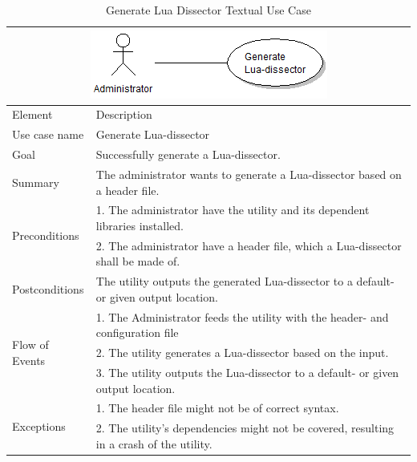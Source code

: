 \begin{table}[htbp] \footnotesize \center
\caption{Generate Lua Dissector Textual Use Case\label{tab:textual:generatelua}}
\begin{tabularx}{\textwidth}{l X}
	\multicolumn{2}{c}{\includegraphics[scale=0.8]{./planning/img/uc_generatelua}} \\
	\toprule
	Element & Description\\
	\midrule
	Use case name & Generate Lua-dissector\\
	Goal & Successfully generate a Lua-dissector. \\
	Summary & The administrator wants to generate a Lua-dissector based on a header file. \\
	\multirow{2}{*}{Preconditions} & 1. The administrator have the utility and its dependent libraries installed.  \\
	& 2. The administrator have a header file, which a Lua-dissector shall be made of. \\
	Postconditions & The utility outputs the generated Lua-dissector to a default- or given output location. \\
	\midrule
	\multirow{3}{*}{Flow of Events} & 1. The Administrator feeds the utility with the header- and configuration file\\
	& 2. The utility generates a Lua-dissector based on the input. \\
	& 3. The utility outputs the Lua-dissector to a default- or given output location.\\
	\midrule
	\multirow{2}{*}{Exceptions} & 1. The header file might not be of correct syntax.\\
	& 2. The utility's dependencies might not be covered, resulting in a crash of the utility.\\
	\bottomrule
\end{tabularx}
\end{table}

